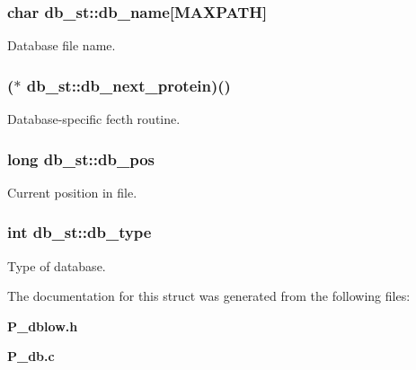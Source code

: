 \subsubsection{\setlength{\rightskip}{0pt plus 5cm}char db\_\-st::db\_\-name[MAXPATH]}\label{structdb__st_m2}


Database file name.

\subsubsection{($\ast$ db\_\-st::db\_\-next\_\-protein)()}\label{structdb__st_m7}


Database-specific fecth routine.

\subsubsection{\setlength{\rightskip}{0pt plus 5cm}long db\_\-st::db\_\-pos}\label{structdb__st_m5}


Current position in file.

\subsubsection{\setlength{\rightskip}{0pt plus 5cm}int db\_\-st::db\_\-type}\label{structdb__st_m6}


Type of database.



The documentation for this struct was generated from the following files:\begin{CompactItemize}
\item 
{\bf P\_\-dblow.h}\item 
{\bf P\_\-db.c}\end{CompactItemize}
